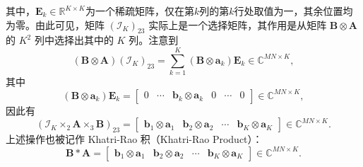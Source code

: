 其中，\( \mathbf{E}_k \in \mathbb{R}^{K \times K} \)为一个稀疏矩阵，仅在第\( k \)列的第\( k \)行处取值为一，其余位置均为零。由此可见，矩阵 \( (\mathcal{I}_K)_{23} \) 实际上是一个选择矩阵，其作用是从矩阵 \( \mathbf{B} \otimes \mathbf{A} \) 的 \( K^2 \) 列中选择出其中的 \( K \) 列。注意到
\[
    (\mathbf{B} \otimes \mathbf{A}) (\mathcal{I}_K)_{23} = \sum_{k=1}^K (\mathbf{B} \otimes \bm{a}_k) \mathbf{E}_k \in \mathbb{C}^{M N \times K},
\]
其中
\[
    (\mathbf{B} \otimes \bm{a}_k) \mathbf{E}_k =\begin{bmatrix}
        0 & \cdots & \bm{b}_k \otimes \bm{a}_k & 0 & \cdots & 0
    \end{bmatrix} \in \mathbb{C}^{M N \times K},
\]
因此有
\[
    (\mathcal{I}_K \times_2 \mathbf{A} \times_3 \mathbf{B})_{23} = \begin{bmatrix}
        \bm{b}_1 \otimes \bm{a}_1 & \bm{b}_2 \otimes \bm{a}_2 & \cdots & \bm{b}_K \otimes \bm{a}_K
    \end{bmatrix} \in \mathbb{C}^{M N \times K}.
\]
上述操作也被记作 Khatri-Rao 积（Khatri-Rao Product）：
\[
    \mathbf{B} \ast  \mathbf{A} = \begin{bmatrix}
        \bm{b}_1 \otimes \bm{a}_1 & \bm{b}_2 \otimes \bm{a}_2 & \cdots & \bm{b}_K \otimes \bm{a}_K
    \end{bmatrix} \in \mathbb{C}^{M N \times K}.
\]

